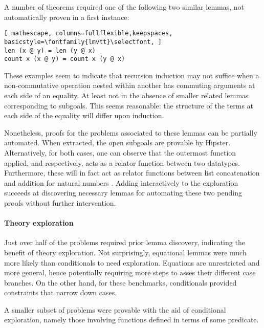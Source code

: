 A number of theorems required one of the following two similar lemmas, not automatically proven in a first instance:

\begin{lstlisting}[ mathescape, columns=fullflexible,keepspaces, basicstyle=\fontfamily{lmvtt}\selectfont, ]
len (x @ y) = len (y @ x)
count x (x @ y) = count x (y @ x)
\end{lstlisting}

\noindent These examples seem to indicate that recursion induction may not suffice when a non-commutative operation nested within another has commuting arguments at each side of an equality.
%
At least not in the absence of smaller related lemmas corresponding to subgoals.
%
This seems reasonable: the structure of the terms at each side of the equality will differ upon induction.

Nonetheless, proofs for the problems associated to these lemmas can be partially automated.
%
When extracted, the open subgoals are provable by Hipster.
%
Alternatively, for both cases, one can observe that the outermost function applied,  and  respectively, acts as a relator function between two datatypes.
%
Furthermore, these will in fact act as relator functions between list concatenation  and addition for natural numbers .
%
Adding interactively  to the exploration succeeds at discovering necessary lemmas for automating these two pending proofs without further intervention.


\paragraph{Theory exploration}

Just over half of the problems required prior lemma discovery, indicating the benefit of theory exploration.
%
Not surprisingly, equational lemmas were much more likely than conditionals to need exploration.
%
Equations are unrestricted and more general, hence potentially requiring more steps to asses their different case branches.
%
On the other hand, for these benchmarks, conditionals provided constraints that narrow down cases.

A smaller subset of problems were provable with the aid of conditional exploration, namely those involving functions defined in terms of some predicate.

